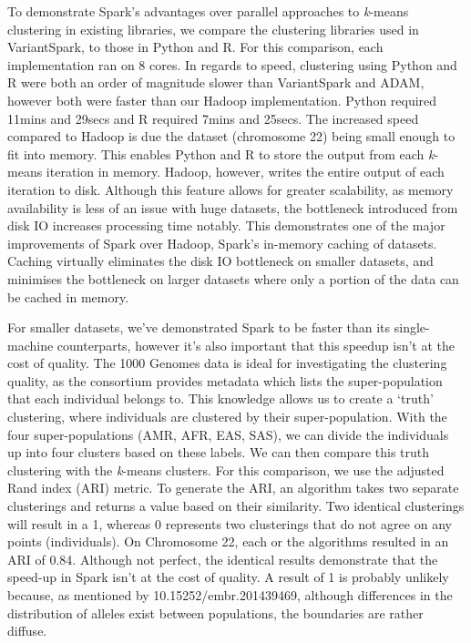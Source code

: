 \documentclass{bmcart}
\newcommand{\variantSpark}{{\sc VariantSpark}}
\newcommand{\kMeans}{\textit{k}-means}
\newcommand{\ARI}{adjusted Rand index}
\begin{document}
To demonstrate {\sc Spark}'s advantages over parallel approaches to \kMeans{} clustering in existing libraries, we compare the clustering libraries used in {\variantSpark}, to those in Python and R. For this comparison, each implementation ran on 8 cores.
In regards to speed, clustering using Python and R were both an order of magnitude slower than \variantSpark{} and ADAM, however both were faster than our Hadoop implementation. Python required 11mins and 29secs and R required 7mins and 25secs.
The increased speed compared to Hadoop is due the dataset (chromosome 22) being small enough to fit into memory. This enables Python and R to store the output from each \kMeans{} iteration in memory. Hadoop, however, writes the entire output of each iteration to disk.
Although this feature allows for greater scalability, as memory availability is less of an issue with huge datasets, the bottleneck introduced from disk IO increases processing time notably.
This demonstrates one of the major improvements of {\sc Spark} over Hadoop, {\sc Spark}'s in-memory caching of datasets. Caching virtually eliminates the disk IO bottleneck on smaller datasets, and minimises the bottleneck on larger datasets where only a portion of the data can be cached in memory.

For smaller datasets, we've demonstrated {\sc Spark} to be faster than its single-machine counterparts, however it's also important that this speedup isn't at the cost of quality.
The 1000 Genomes data is ideal for investigating the clustering quality, as the consortium provides metadata which lists the super-population that each individual belongs to. This knowledge allows us to create a `truth' clustering, where individuals are clustered by their super-population.
With the four super-populations (AMR, AFR, EAS, SAS), we can divide the individuals up into four clusters based on these labels. We can then compare this truth clustering with the \kMeans{} clusters.
For this comparison, we use the \ARI{} (ARI) metric. To generate the ARI, an algorithm takes two separate clusterings and returns a value based on their similarity.
Two identical clusterings will result in a 1, whereas 0 represents two clusterings that do not agree on any points (individuals). On Chromosome 22, each or the algorithms resulted in an ARI of 0.84. Although not perfect, the identical results demonstrate that the speed-up in {\sc Spark} isn't at the cost of quality.
A result of 1 is probably unlikely because, as mentioned by 10.15252/embr.201439469, although differences in the distribution of alleles exist between populations, the boundaries are rather diffuse. %
\end{document}
